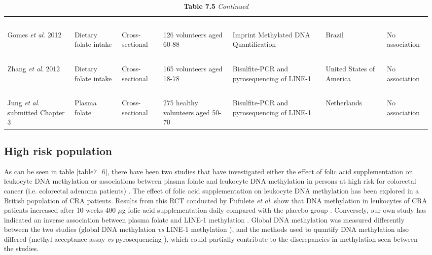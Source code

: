 \begin{center} 
\begin{sidewaystable}
\small
\caption*{\textbf{Table 7.5} \emph{Continued}} 
\label{table7_5}
\begin{tabular}{L{1.8cm}L{1.8cm}L{1.8cm}L{2.2cm}L{2.7cm}L{1.8cm}L{2.5cm}} 
~ & ~ & ~ & ~ & ~ & ~ & ~\\
Gomes \textit{et al}. 2012 \cite{c79} & Dietary folate intake & Cross-sectional & 126 volunteers aged 60-88 & Imprint Methylated DNA Quantification & Brazil & No association\\
~ & ~ & ~ & ~ & ~ & ~ & ~\\
Zhang \textit{et al}. 2012 \cite{c711} & Dietary folate intake & Cross-sectional & 165 volunteers aged 18-78 & Bisulfite-PCR and pyrosequencing of LINE-1 & United States of America & No association\\
~ & ~ & ~ & ~ & ~ & ~ & ~\\
{Jung \textit{et al}. submitted \cite{c77}} Chapter 3 & Plasma folate & Cross-sectional & { 275 healthy volunteers} aged 50-70 & Bisulfite-PCR and pyrosequencing of LINE-1 & Netherlands & No association\\
\hline
\end{tabular}
\end{sidewaystable}
\end{center}


\subsection{High risk population} %
\noindent As can be seen in table \ref{table7_6}, there have been two studies that have investigated either the effect of folic acid supplementation on leukocyte DNA methylation \cite{c713} or associations between plasma folate and leukocyte DNA methylation in persons at high risk for colorectal cancer (i.e. colorectal adenoma patients) \cite{c714}. The effect of folic acid supplementation on leukocyte DNA methylation has been explored in a British population of CRA patients. Results from this RCT conducted by Pufulete \emph{et al}. show that DNA methylation in leukocytes of CRA patients increased after 10 weeks 400 $\mu$g folic acid supplementation daily compared with the placebo group \cite{c713}. Conversely, our own study has indicated an inverse association between plasma folate and LINE-1 methylation \cite{c714}. Global DNA methylation was measured differently between the two studies (global DNA methylation \cite{c713} \emph{vs} LINE-1 methylation \cite{c714}), and the methods used to quantify DNA 
methylation 
also differed (methyl acceptance assay \cite{c713} \emph{vs} pyrosequencing \cite{c714}), which could partially contribute to the discrepancies in methylation seen between the studies. 
 

